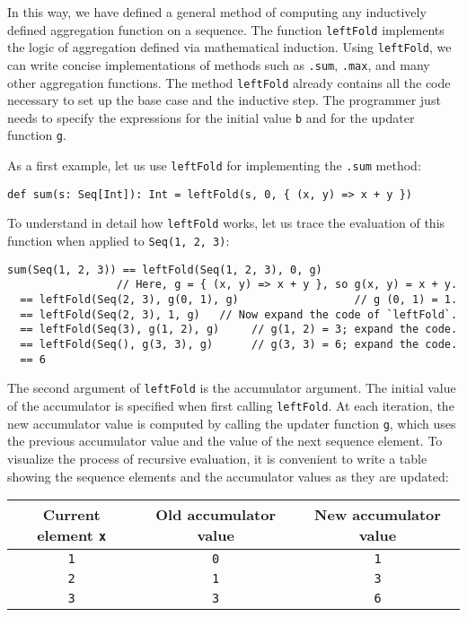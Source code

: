 In this way, we have defined a general method of computing any inductively
defined aggregation function on a sequence. The function \lstinline!leftFold!
implements the logic of aggregation defined via
mathematical induction. Using \lstinline!leftFold!, we can write
concise implementations of methods such as \lstinline!.sum!, \lstinline!.max!,
and many other aggregation functions. The method \lstinline!leftFold!
already contains all the code necessary to set up the base case and
the inductive step. The programmer just needs to specify the expressions
for the initial value \lstinline!b! and for the updater function
\lstinline!g!.

As a first example, let us use \lstinline!leftFold! for implementing
the \lstinline!.sum! method:
\begin{lstlisting}
def sum(s: Seq[Int]): Int = leftFold(s, 0, { (x, y) => x + y })
\end{lstlisting}
To understand in detail how \lstinline!leftFold! works, let us trace
the evaluation of this function when applied to \lstinline!Seq(1, 2, 3)!:
\begin{lstlisting}
sum(Seq(1, 2, 3)) == leftFold(Seq(1, 2, 3), 0, g)
                 // Here, g = { (x, y) => x + y }, so g(x, y) = x + y.
  == leftFold(Seq(2, 3), g(0, 1), g)                  // g (0, 1) = 1.
  == leftFold(Seq(2, 3), 1, g)   // Now expand the code of `leftFold`.
  == leftFold(Seq(3), g(1, 2), g)     // g(1, 2) = 3; expand the code.
  == leftFold(Seq(), g(3, 3), g)      // g(3, 3) = 6; expand the code.
  == 6
\end{lstlisting}
The second argument of \lstinline!leftFold! is the accumulator argument.
The initial value of the accumulator is specified when first calling
\lstinline!leftFold!. At each iteration, the new accumulator value
is computed by calling the updater function \lstinline!g!, which
uses the previous accumulator value and the value of the next sequence
element. To visualize the process of recursive evaluation, it is convenient
to write a table showing the sequence elements and the accumulator
values as they are updated:
\begin{center}
\begin{tabular}{|c|c|c|}
\hline 
\textbf{\small{}Current element }\lstinline!x! & \textbf{\small{}Old accumulator value} & \textbf{\small{}New accumulator value}\tabularnewline
\hline 
\hline 
{\small{}}\lstinline!1! & {\small{}}\lstinline!0! & {\small{}}\lstinline!1!\tabularnewline
\hline 
{\small{}}\lstinline!2! & {\small{}}\lstinline!1! & {\small{}}\lstinline!3!\tabularnewline
\hline 
{\small{}}\lstinline!3! & {\small{}}\lstinline!3! & {\small{}}\lstinline!6!\tabularnewline
\hline 
\end{tabular}
\par\end{center}

